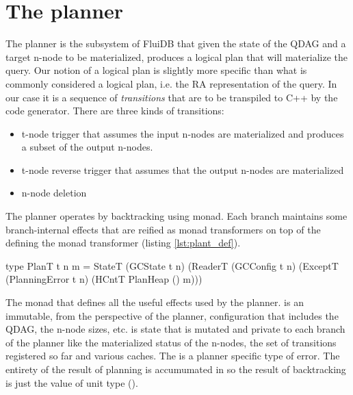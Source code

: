 \section{The planner}
\label{sec:planner}

The planner is the subsystem of FluiDB that given the state of the
QDAG and a target n-node to be materialized, produces a logical plan
that will materialize the query.  Our notion of a logical plan is
slightly more specific than what is commonly considered a logical
plan, i.e. the RA representation of the query. In our case it is a
sequence of \emph{transitions} that are to be transpiled to C++ by the
code generator. There are three kinds of transitions:

\begin{itemize}
\item t-node trigger that assumes the input n-nodes are materialized and
produces a subset of the output n-nodes.
\item t-node reverse trigger that assumes that the output n-nodes are materialized
\item n-node deletion
\end{itemize}

The planner operates by backtracking using  monad. Each branch
maintains some branch-internal effects that are reified as monad
transformers on top of the  defining the  monad
transformer (listing \ref{lst:plant_def}).

\begin{code}
\begin{haskellcode}
type PlanT t n m =
  StateT
    (GCState t n)
    (ReaderT (GCConfig t n)
     (ExceptT (PlanningError t n)
      (HCntT PlanHeap () m)))
\end{haskellcode}
  \caption{\label{lst:plant_def}The monad that defines all the useful
    effects used by the planner.  is an immutable,
    from the perspective of the planner, configuration that includes
    the QDAG, the n-node sizes, etc.  is state that is
    mutated and private to each branch of the planner like the
    materialized status of the n-nodes, the set of transitions
    registered so far and various caches. The 
    is a planner specific type of error. The entirety of the result of
    planning is accumumated in  so the result of
    backtracking is just the value of unit type (\hask{()}).}
\end{code}

